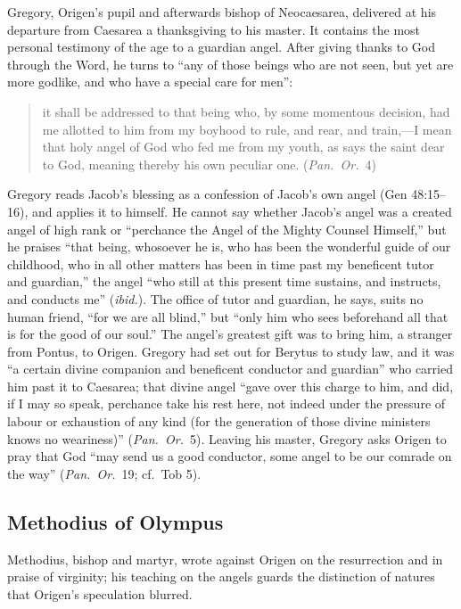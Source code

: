 Gregory, Origen's pupil and afterwards bishop of Neocaesarea, delivered
at his departure from Caesarea a thanksgiving to his master. It contains
the most personal testimony of the age to a guardian angel. After giving
thanks to God through the Word, he turns to ``any of those beings who are
not seen, but yet are more godlike, and who have a special care for men'':

\begin{quote}
it shall be addressed to that being who, by some momentous decision, had
me allotted to him from my boyhood to rule, and rear, and train,---I mean
that holy angel of God who fed me from my youth, as says the saint dear to
God, meaning thereby his own peculiar one. (\emph{Pan.\ Or.}\ 4)
\end{quote}

\noindent Gregory reads Jacob's blessing as a confession of Jacob's own
angel (Gen 48:15--16), and applies it to himself. He cannot say whether
Jacob's angel was a created angel of high rank or ``perchance the Angel of
the Mighty Counsel Himself,'' but he praises ``that being, whosoever he is,
who has been the wonderful guide of our childhood, who in all other matters
has been in time past my beneficent tutor and guardian,'' the angel ``who
still at this present time sustains, and instructs, and conducts me''
(\emph{ibid.}). The office of tutor and guardian, he says, suits no human
friend, ``for we are all blind,'' but ``only him who sees beforehand all
that is for the good of our soul.'' The angel's greatest gift was to bring
him, a stranger from Pontus, to Origen. Gregory had set out for Berytus to
study law, and it was ``a certain divine companion and beneficent conductor
and guardian'' who carried him past it to Caesarea; that divine angel ``gave over this charge to him, and did, if I may so speak, perchance take
his rest here, not indeed under the pressure of labour or exhaustion of any
kind (for the generation of those divine ministers knows no weariness)''
(\emph{Pan.\ Or.}\ 5). Leaving his master, Gregory asks Origen to pray that
God ``may send us a good conductor, some angel to be our comrade on the
way'' (\emph{Pan.\ Or.}\ 19; cf.\ Tob 5).

\sectionguard
\subsection{Methodius of Olympus}

Methodius, bishop and martyr, wrote against Origen on the resurrection
and in praise of virginity; his teaching on the angels guards the
distinction of natures that Origen's speculation blurred.

